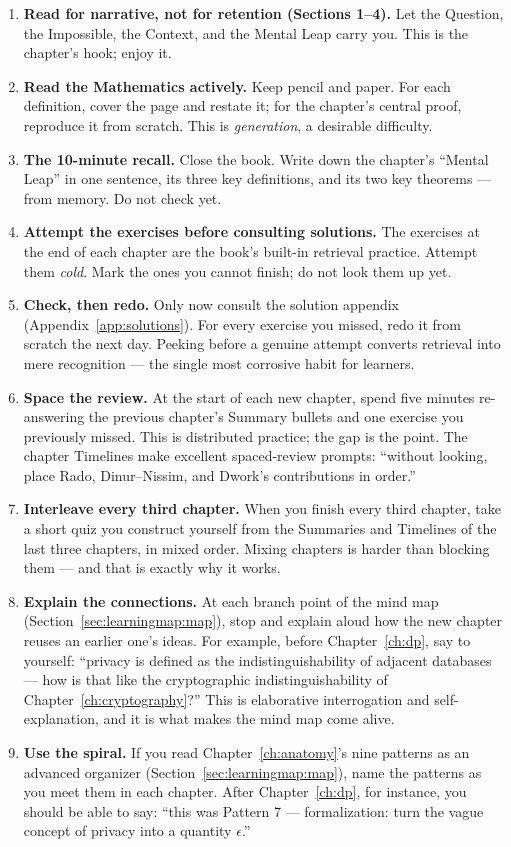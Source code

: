 \begin{enumerate}
\item \textbf{Read for narrative, not for retention (Sections 1--4).} Let the Question, the Impossible, the Context, and the Mental Leap carry you. This is the chapter's hook; enjoy it.
\item \textbf{Read the Mathematics actively.} Keep pencil and paper. For each definition, cover the page and restate it; for the chapter's central proof, reproduce it from scratch. This is \emph{generation}, a desirable difficulty.
\item \textbf{The 10-minute recall.} Close the book. Write down the chapter's ``Mental Leap'' in one sentence, its three key definitions, and its two key theorems --- from memory. Do not check yet. 
\item \textbf{Attempt the exercises before consulting solutions.} The exercises at the end of each chapter are the book's built-in retrieval practice. Attempt them \emph{cold}. Mark the ones you cannot finish; do not look them up yet.
\item \textbf{Check, then redo.} Only now consult the solution appendix (Appendix~\ref{app:solutions}). For every exercise you missed, redo it from scratch the next day. Peeking before a genuine attempt converts retrieval into mere recognition --- the single most corrosive habit for learners.
\item \textbf{Space the review.} At the start of each new chapter, spend five minutes re-answering the previous chapter's Summary bullets and one exercise you previously missed. This is distributed practice; the gap is the point. The chapter Timelines make excellent spaced-review prompts: ``without looking, place Rado, Dinur--Nissim, and Dwork's contributions in order.''
\item \textbf{Interleave every third chapter.} When you finish every third chapter, take a short quiz you construct yourself from the Summaries and Timelines of the last three chapters, in mixed order. Mixing chapters is harder than blocking them --- and that is exactly why it works.
\item \textbf{Explain the connections.} At each branch point of the mind map (Section~\ref{sec:learningmap:map}), stop and explain aloud how the new chapter reuses an earlier one's ideas. For example, before Chapter~\ref{ch:dp}, say to yourself: ``privacy is defined as the indistinguishability of adjacent databases --- how is that like the cryptographic indistinguishability of Chapter~\ref{ch:cryptography}?'' This is elaborative interrogation and self-explanation, and it is what makes the mind map come alive.
\item \textbf{Use the spiral.} If you read Chapter~\ref{ch:anatomy}'s nine patterns as an advanced organizer (Section~\ref{sec:learningmap:map}), name the patterns as you meet them in each chapter. After Chapter~\ref{ch:dp}, for instance, you should be able to say: ``this was Pattern 7 --- formalization: turn the vague concept of privacy into a quantity $\epsilon$.''
\end{enumerate}

